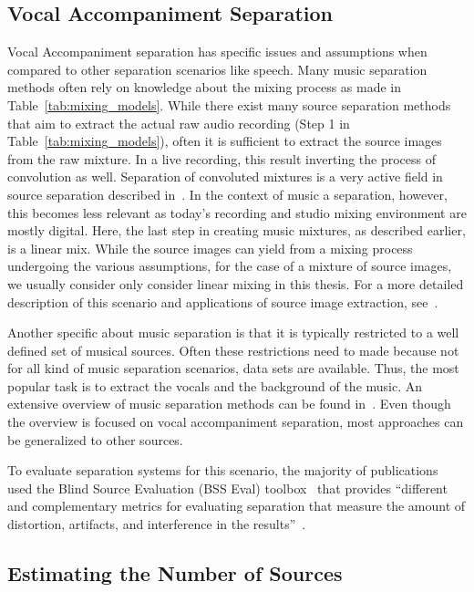 \subsection{Vocal Accompaniment Separation}
Vocal Accompaniment separation has specific issues and assumptions when compared to other separation scenarios like speech.
Many music separation methods often rely on knowledge about the mixing process as made in Table~\ref{tab:mixing_models}.
While there exist many source separation methods that aim to extract the actual raw audio recording (Step 1 in  Table~\ref{tab:mixing_models}), often it is sufficient to extract the source images from the raw mixture.
In a live recording, this result inverting the process of convolution as well.
Separation of convoluted mixtures is a very active field in source separation described in~\cite{pedersen07}.
In the context of music a separation, however, this becomes less relevant as today's recording and studio mixing environment are mostly digital.
Here, the last step in creating music mixtures, as described earlier, is a linear mix.
While the source images can yield from a mixing process undergoing the various assumptions, for the case of a mixture of source images, we usually consider only consider linear mixing in this thesis.
For a more detailed description of this scenario and applications of source image extraction, see~\cite{sturmel12}.
\par
Another specific about music separation is that it is typically restricted to a well defined set of musical sources.
Often these restrictions need to made because not for all kind of music separation scenarios, data sets are available.
Thus, the most popular task is to extract the vocals and the background of the music.
An extensive overview of music separation methods can be found in~\cite{rafii18}.
Even though the overview is focused on vocal accompaniment separation, most approaches can be generalized to other sources.
\par
To evaluate separation systems for this scenario, the majority of publications used the Blind Source Evaluation (BSS Eval) toolbox~\cite{fevotte05,vincent06} that provides ``different and complementary metrics for evaluating separation that measure the amount of distortion, artifacts, and interference in the results''~\cite{rafii18}.

\subsection{Estimating the Number of Sources}

